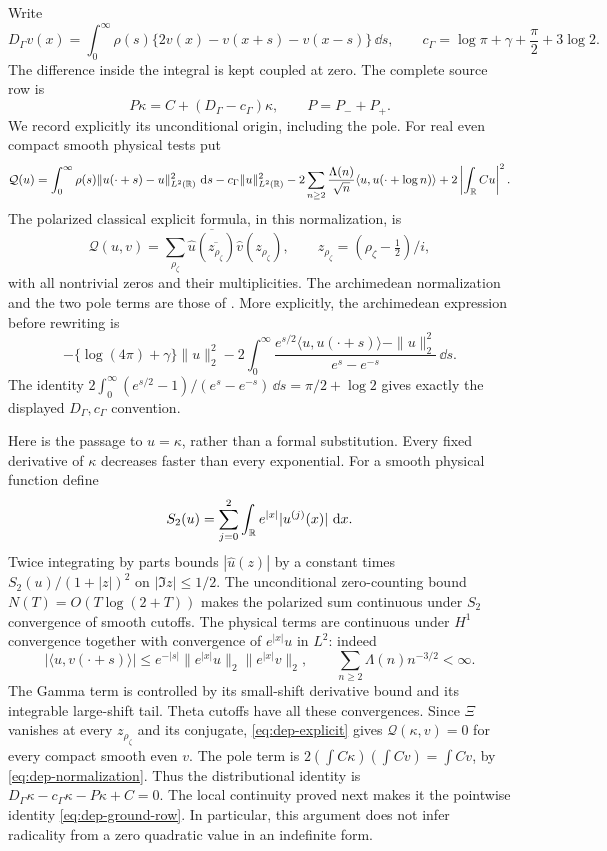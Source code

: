 Write
\[
 D_\Gamma v(x)=\int_0^\infty\rho(s)
       \{2v(x)-v(x+s)-v(x-s)\}\,\dd s,
 \qquad
 c_\Gamma=\log\pi+\gamma+\frac\pi2+3\log2.
\]
The difference inside the integral is kept coupled at zero. The complete
source row is
\begin{equation}\label{eq:dep-ground-row}
 P\kappa=C+(D_\Gamma-c_\Gamma)\kappa,
 \qquad P=P_-+P_+.
\end{equation}
We record explicitly its unconditional origin, including the pole.
For real even compact smooth physical tests put
\[
 \mathcal Q(u)=\int_0^\infty\rho(s)
             \|u(\cdot+s)-u\|_{L^2(\mathbb R)}^2\,\,\mathrm d s
 -c_\Gamma\|u\|_{L^2(\mathbb R)}^2
 -2\sum_{n\ge2}\frac{\Lambda(n)}{\sqrt n}
                      \langle u,u(\cdot+\log n)\rangle
 +2\left|\int_{\mathbb R}Cu\right|^2.
\]
The polarized classical explicit formula, in this normalization, is
\begin{equation}\label{eq:dep-explicit}
 \mathcal Q(u,v)=\sum_{\rho_\zeta}
    \overline{\widehat u(\overline{z_{\rho_\zeta}})}
                        \widehat v(z_{\rho_\zeta}),
 \qquad z_{\rho_\zeta}=(\rho_\zeta-\tfrac12)/i,
\end{equation}
with all nontrivial zeros and their multiplicities. The archimedean
normalization and the two pole terms are those of
\cite[Appendix B]{ConnesConsani2021}. More explicitly, the archimedean
expression before rewriting is
\[
 -\{\log(4\pi)+\gamma\}\|u\|_2^2
 -2\int_0^\infty
 \frac{e^{s/2}\langle u,u(\cdot+s)\rangle-\|u\|_2^2}
      {e^s-e^{-s}}\,\dd s.
\]
The identity
$2\int_0^\infty(e^{s/2}-1)/(e^s-e^{-s})\,\dd s
=\pi/2+\log2$ gives exactly the displayed $D_\Gamma,c_\Gamma$ convention.

Here is the passage to $u=\kappa$, rather than a formal substitution.
Every fixed derivative of $\kappa$ decreases faster than every exponential.
For a smooth physical function define
\[
 S_2(u)=\sum_{j=0}^2\int_{\mathbb R}e^{|x|}|u^{(j)}(x)|\,\,\mathrm d x.
\]
Twice integrating by parts bounds $|\widehat u(z)|$ by a constant times
$S_2(u)/(1+|z|)^2$ on $|\Im z|\le1/2$. The unconditional zero-counting
bound $N(T)=O(T\log(2+T))$ makes the polarized sum continuous under
$S_2$ convergence of smooth cutoffs. The physical terms are continuous
under $H^1$ convergence together with convergence of
$e^{|x|}u$ in $L^2$: indeed
\[
 |\langle u,v(\cdot+s)\rangle|
 \le e^{-|s|}\|e^{|x|}u\|_2\|e^{|x|}v\|_2,
 \qquad \sum_{n\ge2}\Lambda(n)n^{-3/2}<\infty.
\]
The Gamma term is controlled by its small-shift derivative bound and its
integrable large-shift tail. Theta cutoffs have all these convergences.
Since $\Xi$ vanishes at every $z_{\rho_\zeta}$ and its conjugate,
\eqref{eq:dep-explicit} gives $\mathcal Q(\kappa,v)=0$ for every compact
smooth even $v$. The pole term is
$2(\int C\kappa)(\int Cv)=\int Cv$, by
\eqref{eq:dep-normalization}. Thus the distributional identity is
$D_\Gamma\kappa-c_\Gamma\kappa-P\kappa+C=0$.
The local continuity proved next makes it the pointwise identity
\eqref{eq:dep-ground-row}. In particular, this argument does not infer
radicality from a zero quadratic value in an indefinite form.

